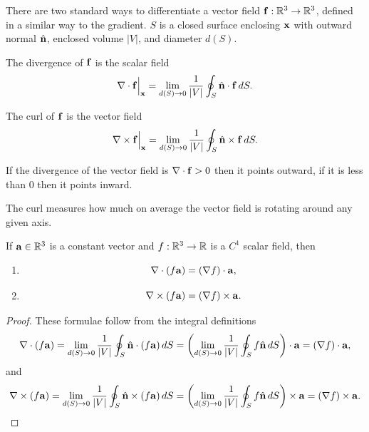 \documentclass[10pt, a4paper]{article}
\begin{document}
There are two standard ways to differentiate a vector field $\mathbf{f} : \mathbb{R} ^ 3 \to \mathbb{R} ^ 3$,
defined in a similar way to the gradient.
$S$ is a closed surface enclosing $\mathbf{x}$ with outward normal $\hat{\mathbf{n}}$,
enclosed volume $|V|$,
and diameter $d(S)$.

\begin{definition}[Divergence]
    The divergence of $\mathbf{f}$ is the scalar field
    \[
    \mathbf{\nabla}\cdot\mathbf{f}\Bigr\rvert_{\mathbf{x}} = \lim_{d(S) \to 0}\frac{1}{|V|}\oint_{S}\hat{\mathbf{n}}\cdot\mathbf{f}\,dS.
    \]
\end{definition}

\begin{definition}[Curl]
    The curl of $\mathbf{f}$ is the vector field
    \[
    \mathbf{\nabla}\times\mathbf{f}\Bigr\rvert_{\mathbf{x}} = \lim_{d(S) \to 0}\frac{1}{|V|}\oint_{S}\hat{\mathbf{n}}\times\mathbf{f}\,dS.
    \]
\end{definition}

If the divergence of the vector field is $\mathbf{\nabla} \cdot \mathbf{f} > 0$ then it points outward,
if it is less than $0$ then it points inward.

The curl measures how much on average the vector field is rotating around any given axis.

\begin{lemma}
    If $\mathbf{a} \in \mathbb{R} ^ 3$ is a constant vector and $f : \mathbb{R} ^ 3 \to \mathbb{R}$ is a $C ^ 1$ scalar field,
    then
    \begin{enumerate}[label = (\roman*)]
        \item
        \[
        \mathbf{\nabla} \cdot (f\mathbf{a}) = (\mathbf{\nabla} f) \cdot\mathbf{a},
        \]

        \item
        \[
        \mathbf{\nabla} \times (f\mathbf{a}) = (\mathbf{\nabla} f) \times\mathbf{a}.
        \]
    \end{enumerate}

    \begin{proof}
        These formulae follow from the integral definitions
        \[
        \mathbf{\nabla} \cdot (f\mathbf{a}) = \lim_{d(S) \to 0}\frac{1}{|V|}\oint_{S}\hat{\mathbf{n}}\cdot(f\mathbf{a})\,dS = \left(\lim_{d(S) \to 0}\frac{1}{|V|}\oint_{S}f\hat{\mathbf{n}}\,dS\right) \cdot \mathbf{a} = (\mathbf{\nabla} f) \cdot\mathbf{a},
        \]
        and
        \[
        \mathbf{\nabla} \times (f\mathbf{a}) = \lim_{d(S) \to 0}\frac{1}{|V|}\oint_{S}\hat{\mathbf{n}}\times(f\mathbf{a})\,dS = \left(\lim_{d(S) \to 0}\frac{1}{|V|}\oint_{S}f\hat{\mathbf{n}}\,dS\right) \times \mathbf{a} = (\mathbf{\nabla} f) \times\mathbf{a}.
        \]
    \end{proof}
\end{lemma}
\end{document}
